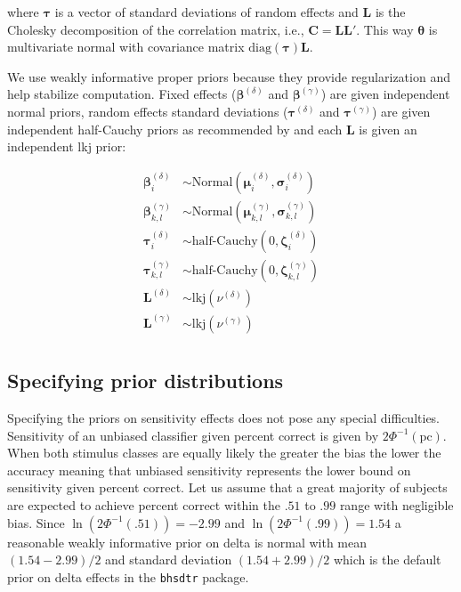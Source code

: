 \documentclass[oneside,a4paper]{article}
\begin{document}
\noindent where $\bm{\tau}$ is a vector of standard deviations of
random effects and $\bm{L}$ is the Cholesky decomposition of the
correlation matrix, i.e., $\bm{C} = \bm{L} \bm{L}'$. This way
$\bm{\theta}$ is multivariate normal with covariance matrix
$\text{diag}(\bm{\tau}) \bm{L}$.

We use weakly informative proper priors because they provide
regularization and help stabilize computation. Fixed effects
($\bm{\beta}^{(\delta)}$ and $\bm{\beta}^{(\gamma)}$) are given
independent normal priors, random effects standard deviations
($\bm{\tau}^{(\delta)}$ and $\bm{\tau}^{(\gamma)}$) are given
independent half-Cauchy priors as recommended by
 and each $\bm{L}$ is given an independent lkj
prior:

\begin{align*}
  \bm{\beta}^{(\delta)}_i &\sim \text{Normal}(\bm{\mu}^{(\delta)}_i, \bm{\sigma}^{(\delta)}_i) \\
  \bm{\beta}^{(\gamma)}_{k,l} &\sim \text{Normal}(\bm{\mu}^{(\gamma)}_{k,l}, \bm{\sigma}^{(\gamma)}_{k,l}) \\
  \bm{\tau}^{(\delta)}_i &\sim \text{half-Cauchy}(0, \bm{\zeta}^{(\delta)}_i) \\
  \bm{\tau}^{(\gamma)}_{k,l} &\sim \text{half-Cauchy}(0, \bm{\zeta}^{(\gamma)}_{k,l}) \\
  \bm{L}^{(\delta)} &\sim \text{lkj}(\nu^{(\delta)}) \\
  \bm{L}^{(\gamma)} &\sim \text{lkj}(\nu^{(\gamma)}) \\
\end{align*}

\subsection{Specifying prior distributions}

Specifying the priors on sensitivity effects does not pose any special
difficulties. Sensitivity of an unbiased classifier given percent
correct is given by $2 \Phi^{-1}(\text{pc})$. When both stimulus
classes are equally likely the greater the bias the lower the accuracy
meaning that unbiased sensitivity represents the lower bound on
sensitivity given percent correct. Let us assume that a great majority
of subjects are expected to achieve percent correct within the $.51$
to $.99$ range with negligible bias. Since
$\ln(2\Phi^{-1}(.51)) = -2.99$ and $\ln(2 \Phi^{-1}(.99)) = 1.54$ a
reasonable weakly informative prior on delta is normal with mean
$(1.54 - 2.99) / 2$ and standard deviation $(1.54 + 2.99) / 2$ which
is the default prior on delta effects in the \texttt{bhsdtr}
package.
\end{document}
